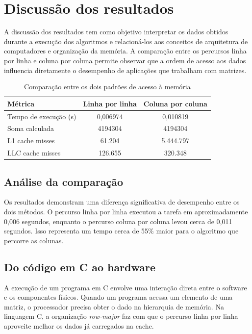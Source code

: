 \chapter{Discussão dos resultados}
\label{cap:discussao}

A discussão dos resultados tem como objetivo interpretar os dados obtidos durante a execução dos algoritmos e relacioná-los aos conceitos de arquitetura de computadores e organização da memória. A comparação entre os percursos linha por linha e coluna por coluna permite observar que a ordem de acesso aos dados influencia diretamente o desempenho de aplicações que trabalham com matrizes.

\begin{table}[H]
    \centering
    \caption{Comparação entre os dois padrões de acesso à memória}
    \label{tab:comparacao}
    \begin{tabular}{lcc}
        \toprule
        \textbf{Métrica} & \textbf{Linha por linha} & \textbf{Coluna por coluna} \\
        \midrule
        Tempo de execução (s) & 0,006974 & 0,010819 \\
        Soma calculada & 4194304 & 4194304 \\
        L1 cache misses & 61.204 & 5.444.797 \\
        LLC cache misses & 126.655 & 320.348 \\
        \bottomrule
    \end{tabular}
\end{table}

\section{Análise da comparação}
Os resultados demonstram uma diferença significativa de desempenho entre os dois métodos. O percurso linha por linha executou a tarefa em aproximadamente 0,006 segundos, enquanto o percurso coluna por coluna levou cerca de 0,011 segundos. Isso representa um tempo cerca de 55\% maior para o algoritmo que percorre as colunas.

\section{Do código em C ao hardware}
A execução de um programa em C envolve uma interação direta entre o software e os componentes físicos. Quando um programa acessa um elemento de uma matriz, o processador precisa obter o dado na hierarquia de memória. Na linguagem C, a organização \textit{row-major} faz com que o percurso linha por linha aproveite melhor os dados já carregados na cache.

